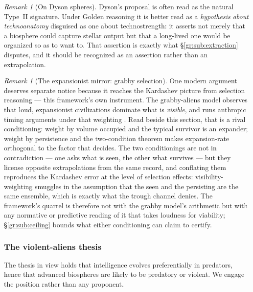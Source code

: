 \documentclass[11pt]{article}
\numberwithin{equation}{section}
\theoremstyle{plain}
\theoremstyle{definition}
\theoremstyle{remark}
\newtheorem{remark}[theorem]{Remark}
\begin{document}
\begin{remark}[On Dyson spheres]\label{gr:rem:dyson}
Dyson's proposal \cite{Dys60} is often read as the natural
Type~II signature. Under Golden reasoning it is better read as a
\emph{hypothesis about technoanatomy} disguised as one about
technostrength: it asserts not merely that a biosphere could capture
stellar output but that a long-lived one would be organized so as to
want to. That assertion is exactly what \S\ref{gr:sub:extraction}
disputes, and it should be recognized as an assertion rather than an
extrapolation.
\end{remark}

\begin{remark}[The expansionist mirror: grabby selection]
\label{gr:rem:grabby}
One modern argument deserves separate notice because it reaches the
Kardashev picture from selection reasoning --- this framework's own
instrument. The grabby-aliens model observes that loud, expansionist
civilizations dominate what is \emph{visible}, and runs anthropic
timing arguments under that weighting \cite{HMMP21}. Read beside this
section, that is a rival conditioning: weight by volume occupied and
the typical survivor is an expander; weight by persistence and the
two-condition theorem makes expansion-rate orthogonal to the factor
that decides. The two conditionings are not in contradiction --- one
asks what is seen, the other what survives --- but they license
opposite extrapolations from the same record, and conflating them
reproduces the Kardashev error at the level of selection effects:
visibility-weighting smuggles in the assumption that the seen and the
persisting are the same ensemble, which is exactly what the trough
channel denies. The framework's quarrel is therefore not with the
grabby model's arithmetic but with any normative or predictive reading
of it that takes loudness for viability; \S\ref{gr:sub:ceiling} bounds
what either conditioning can claim to certify.
\end{remark}

\subsubsection{The violent-aliens thesis}\label{gr:subsub:violence}

The thesis in view holds that intelligence evolves preferentially in
predators, hence that advanced biospheres are likely to be predatory or
violent. We engage the position rather than any proponent.
\end{document}
